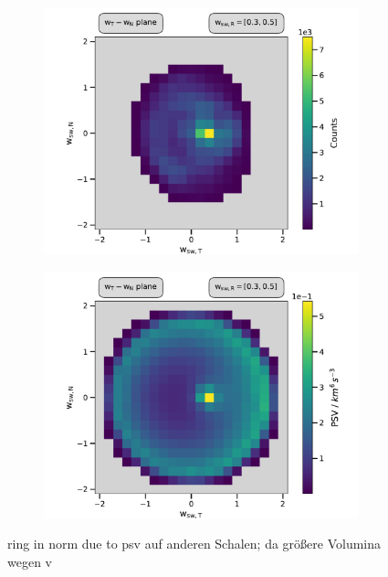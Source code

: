 \begin{figure}
	\centering
	\begin{subfigure}{.5\textwidth}
		\centering
		\includegraphics[width=1\textwidth]{Figures/slice_50_counts.pdf}
	\end{subfigure}%
	\begin{subfigure}{.5\textwidth}
		\centering
		\includegraphics[width=1\textwidth]{Figures/slice_50_norm.pdf}
	\end{subfigure}
	\caption{ring in norm due to psv auf anderen Schalen; da größere Volumina wegen v}
	\label{fig:counts_norm_50}
\end{figure}



